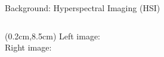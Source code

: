 \documentclass[aspectratio=169,xcolor=dvipsnames]{beamer}
\begin{document}
\begin{frame}{Background: Hyperspectral Imaging (HSI)}
\begin{columns}
\begin{column}{0.48\textwidth}
            \begin{textblock*}{5cm}(0.2cm,8.5cm)
                \tiny Left image: \cite{hsi-cube} \\ Right image: \cite{nat-presentation}
            \end{textblock*}

        \end{column}
    \end{columns}
\end{frame}

\end{document}
